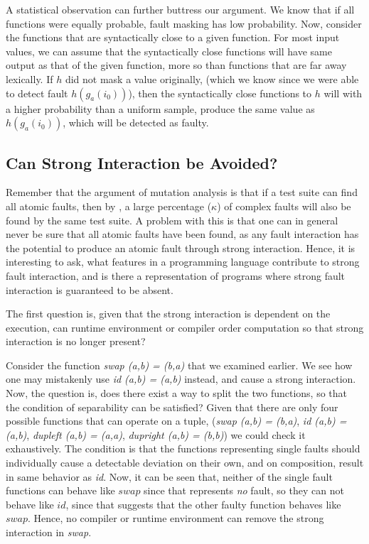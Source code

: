 \documentclass[preprint,nonatbib]{sigplanconf}\usepackage[]{graphicx}\usepackage[]{color}
\begin{document}
A statistical observation can further buttress our argument. We know that
if all functions were equally probable, fault masking has low probability.
Now, consider the functions that are syntactically close to a given function.
For most input values, we can assume that the syntactically close functions
will have same output as that of the given function, more so than functions
that are far away lexically. If $h$ did not mask a value originally, (which
we know since we were able to detect fault $h(g_a(i_0))$), then the
syntactically close functions to $h$ will with a higher probability than a
uniform sample, produce the same value as $h(g_a(i_0))$, which will be detected
as faulty.


\subsection{Can Strong Interaction be Avoided?}

Remember that the argument of mutation analysis is that if a test suite can find
all atomic faults, then by \faultT, a large percentage ($\kappa$) of
complex faults will also be found by the same test suite. A problem with this
is that one can in general never be sure that all atomic faults have been found,
as any fault interaction has the potential to produce an atomic fault through
strong interaction.
Hence, it is interesting to ask, what features in a programming language
contribute to strong fault interaction, and is there a representation of
programs where strong fault interaction is guaranteed to be absent.

The first question is, given that the strong interaction is dependent on the
execution, can runtime environment or compiler order computation so that strong
interaction is no longer present?

Consider the function \emph{swap (a,b) = (b,a)} that we examined earlier. We
see how one may mistakenly use \emph{id (a,b) = (a,b)} instead, and cause a
strong interaction. Now, the question is, does there exist a way to split the
two functions, so that the condition of separability can be satisfied?
Given that there are only four possible functions that can operate on a tuple,
(\emph{swap (a,b) = (b,a)}, \emph{id (a,b) = (a,b)}, \emph{dupleft (a,b) = (a,a)}, \emph{dupright (a,b) = (b,b)})
we could check it exhaustively. The condition is that the functions representing
single faults should individually cause a detectable deviation on their own, and
on composition, result in same behavior as \emph{id}. Now, it can be seen that,
neither of the single fault functions can behave like $swap$ since that
represents \emph{no} fault, so they can not behave like $id$, since that suggests that
the other faulty function behaves like $swap$. Hence, no compiler or runtime
environment can remove the strong interaction in \emph{swap}.
\end{document}
